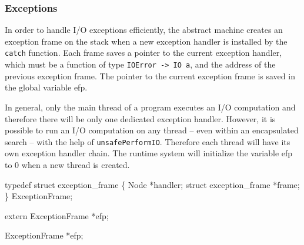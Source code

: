 \subsubsection{Exceptions}
In order to handle I/O exceptions efficiently, the abstract machine
creates an exception frame on the stack when a new exception handler
is installed by the \texttt{catch} function. Each frame saves a
pointer to the current exception handler, which must be a function of
type \texttt{IOError -> IO a}, and the address of the previous
exception frame. The pointer to the current exception frame is saved
in the global variable {\Tt{}efp\nwendquote}.

In general, only the main thread of a program executes an I/O
computation and therefore there will be only one dedicated exception
handler. However, it is possible to run an I/O computation on any
thread -- even within an encapsulated search -- with the help of
\texttt{unsafePerformIO}. Therefore each thread will have its own
exception handler chain. The runtime system will initialize the
variable {\Tt{}efp\nwendquote} to {\Tt{}0\nwendquote} when a new thread is created.

\nwenddocs{}\plusendmoddef\nwstartdeflinemarkup{}\nwenddeflinemarkup
typedef struct exception_frame
\{
    Node                   *handler;
    struct exception_frame *frame;
\} ExceptionFrame;

extern ExceptionFrame *efp;

\nwendcode{}\nwdocspar
\nwenddocs{}\plusendmoddef\nwstartdeflinemarkup{}\nwenddeflinemarkup
ExceptionFrame *efp;
\nwendcode{}

%
%

